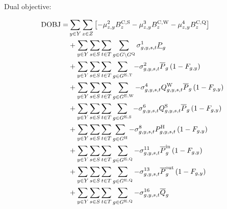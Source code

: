 \documentclass{article}
\begin{document}
Dual objective:

\begin{align}
\textrm{DOBJ} =  & \sum\limits_{\iYear \in \sYears} \sum\limits_{\iZone \in \sZones} \left[- \dSolarBuildLimit \cBuildLimitSolar - \dWindBuildLimit \cBuildLimitWind 
- \dStorageBuildLimit \cBuildLimitStorage
\right] \nonumber\\
& + \sum\limits_{\iYear \in \sYears}\sum\limits_{\iScenario \in \sScenarios}\sum\limits_{\iInterval \in \sIntervals} \sum\limits_{\iGenerator \in \sGenerators \setminus \sStorage} \dMinPowerOutput \cPowerOutputMin \nonumber\\
& + \sum\limits_{\iYear \in \sYears}\sum\limits_{\iScenario \in \sScenarios}\sum\limits_{\iInterval \in \sIntervals} \sum\limits_{\iGenerator \in \sGeneratorsExistingThermal} - \dMaxPowerOutputExistingThermal \cPowerOutputMax[\iGenerator] \left(1 - \cRetirementIndicator\right) \nonumber\\
& + \sum\limits_{\iYear \in \sYears}\sum\limits_{\iScenario \in \sScenarios}\sum\limits_{\iInterval \in \sIntervals} \sum\limits_{\iGenerator \in \sGeneratorsExistingWind} - \dMaxPowerOutputWindExisting \cCapacityFactorWind \cPowerOutputMax[\iGenerator] \left(1 - \cRetirementIndicator\right) \nonumber\\
& + \sum\limits_{\iYear \in \sYears}\sum\limits_{\iScenario \in \sScenarios}\sum\limits_{\iInterval \in \sIntervals} \sum\limits_{\iGenerator \in \sGeneratorsExistingSolar} - \dMaxPowerOutputSolarExisting \cCapacityFactorSolar \cPowerOutputMax[\iGenerator] \left(1 - \cRetirementIndicator\right) \nonumber\\
& + \sum\limits_{\iYear \in \sYears}\sum\limits_{\iScenario \in \sScenarios}\sum\limits_{\iInterval \in \sIntervals} \sum\limits_{\iGenerator \in \sGeneratorsHydro} - \dMaxPowerOutputHydro \cPowerOutputHydro \left(1 - \cRetirementIndicator\right) \nonumber\\
& + \sum\limits_{\iYear \in \sYears}\sum\limits_{\iScenario \in \sScenarios}\sum\limits_{\iInterval \in \sIntervals} \sum\limits_{\iGenerator \in \sStorageExisting} - \dMaxChargingRateExisting \cPowerChargingMax \left(1 - \cRetirementIndicator\right) \nonumber\\
& + \sum\limits_{\iYear \in \sYears}\sum\limits_{\iScenario \in \sScenarios}\sum\limits_{\iInterval \in \sIntervals} \sum\limits_{\iGenerator \in \sStorageExisting} - \dMaxDischargingRateExisting \cPowerDischargingMax \left(1 - \cRetirementIndicator\right) \nonumber\\
& + \sum\limits_{\iYear \in \sYears}\sum\limits_{\iScenario \in \sScenarios}\sum\limits_{\iInterval \in \sIntervals} \sum\limits_{\iGenerator \in \sStorageExisting} - \dMaxStorageEnergyExisting \cStorageUnitEnergyMax \nonumber\\

\end{align}
\end{document}
